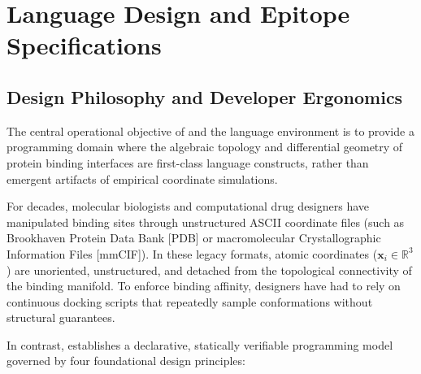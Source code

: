 \chapter{Language Design and Epitope Specifications}
\label{ch:language_design}

\section{Design Philosophy and Developer Ergonomics}
\label{sec:design_philosophy}

The central operational objective of \ToposLang{} and the \PLQ{} language environment is to provide a programming domain where the algebraic topology and differential geometry of protein binding interfaces are first-class language constructs, rather than emergent artifacts of empirical coordinate simulations. 

For decades, molecular biologists and computational drug designers have manipulated binding sites through unstructured ASCII coordinate files (such as Brookhaven Protein Data Bank [PDB] or macromolecular Crystallographic Information Files [mmCIF]). In these legacy formats, atomic coordinates ($\mathbf{x}_i \in \mathbb{R}^3$) are unoriented, unstructured, and detached from the topological connectivity of the binding manifold. To enforce binding affinity, designers have had to rely on continuous docking scripts that repeatedly sample conformations without structural guarantees.

In contrast, \ToposLang{} establishes a declarative, statically verifiable programming model governed by four foundational design principles:

